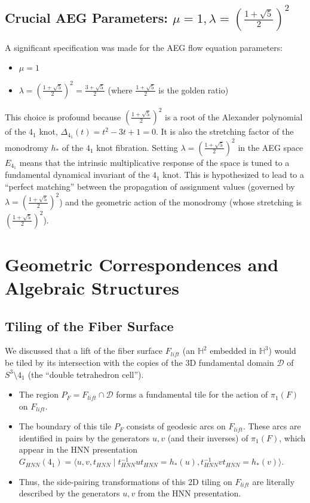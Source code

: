 \documentclass[12pt, a4paper]{article}
\begin{document}
\subsection{Crucial AEG Parameters: $\mu=1, \lambda=\left(\frac{1+\sqrt{5}}{2}\right)^2$}
A significant specification was made for the AEG flow equation parameters:
\begin{itemize}
    \item $\mu = 1$
    \item $\lambda = \left(\frac{1+\sqrt{5}}{2}\right)^2 = \frac{3+\sqrt{5}}{2}$ (where $\frac{1+\sqrt{5}}{2}$ is the golden ratio)
\end{itemize}
This choice is profound because $\left(\frac{1+\sqrt{5}}{2}\right)^2$ is a root of the Alexander polynomial of the $4_1$ knot, $\Delta_{4_1}(t) = t^2 - 3t + 1 = 0$. It is also the stretching factor of the monodromy $h_*$ of the $4_1$ knot fibration.
Setting $\lambda = \left(\frac{1+\sqrt{5}}{2}\right)^2$ in the AEG space $E_{4_1}$ means that the intrinsic multiplicative response of the space is tuned to a fundamental dynamical invariant of the $4_1$ knot. This is hypothesized to lead to a ``perfect matching'' between the propagation of assignment values (governed by $\lambda=\left(\frac{1+\sqrt{5}}{2}\right)^2$) and the geometric action of the monodromy (whose stretching is $\left(\frac{1+\sqrt{5}}{2}\right)^2$).

\section{Geometric Correspondences and Algebraic Structures}
\subsection{Tiling of the Fiber Surface}
We discussed that a lift of the fiber surface $F_{lift}$ (an $\mathbb{H}^2$ embedded in $\mathbb{H}^3$) would be tiled by its intersection with the copies of the 3D fundamental domain $\mathcal{D}$ of $S^3 \setminus 4_1$ (the ``double tetrahedron cell'').
\begin{itemize}
    \item The region $P_F = F_{lift} \cap \mathcal{D}$ forms a fundamental tile for the action of $\pi_1(F)$ on $F_{lift}$.
    \item The boundary of this tile $P_F$ consists of geodesic arcs on $F_{lift}$. These arcs are identified in pairs by the generators $u, v$ (and their inverses) of $\pi_1(F)$, which appear in the HNN presentation $G_{HNN}(4_1) = \langle u,v,t_{HNN} \mid t_{HNN}^{-1}ut_{HNN}=h_*(u), t_{HNN}^{-1}vt_{HNN}=h_*(v) \rangle$.
    \item Thus, the side-pairing transformations of this 2D tiling on $F_{lift}$ are literally described by the generators $u,v$ from the HNN presentation.
\end{itemize}
\end{document}

